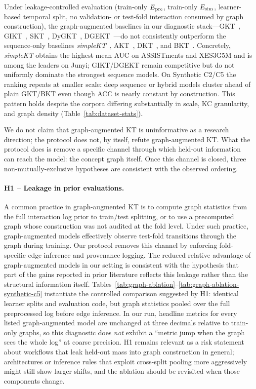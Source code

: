 Under leakage-controlled evaluation (train-only $E_{\text{pre}}$, train-only
$E_{\text{sim}}$, learner-based temporal split, no validation- or test-fold
interaction consumed by graph construction), the graph-augmented
baselines in our diagnostic stack---GKT~\cite{nakagawa2019gkt},
GIKT~\cite{yang2021gikt}, SKT~\cite{tong2020skt},
DyGKT~\cite{dygkt2024}, DGEKT~\cite{dgekt2024}---do not consistently outperform the
sequence-only baselines \textit{simpleKT}~\cite{liu2023simplekt},
AKT~\cite{ghosh2020akt}, DKT~\cite{piech2015dkt}, and BKT~\cite{corbett1995bkt}. Concretely,
\textit{simpleKT} obtains the highest mean AUC on ASSISTments and XES3G5M and is
among the leaders on Junyi; GIKT/DGEKT remain competitive but do not uniformly dominate the strongest sequence models.
On Synthetic C2/C5 the ranking repeats at smaller scale: deep sequence or hybrid models cluster ahead of plain GKT/BKT even though ACC is nearly constant by construction.
This pattern holds despite the corpora differing substantially in scale,
KC granularity, and graph density (Table~\ref{tab:dataset-stats}).

We do not claim that graph-augmented KT is uninformative as a research
direction; the protocol does not, by itself, refute graph-augmented KT.
What the protocol does is remove a specific channel through which
held-out information can reach the model: the concept graph itself.
Once this channel is closed, three non-mutually-exclusive hypotheses
are consistent with the observed ordering.

\paragraph{H1 -- Leakage in prior evaluations.}
A common practice in graph-augmented KT is to compute graph statistics
from the full interaction log prior to train/test splitting, or to use
a precomputed graph whose construction was not audited at the fold
level. Under such practice, graph-augmented models effectively observe
test-fold transitions through the graph during training. Our protocol
removes this channel by enforcing fold-specific edge inference and
provenance logging. The reduced relative advantage of graph-augmented
models in our setting is consistent with the hypothesis that part of
the gains reported in prior literature reflects this leakage rather
than the structural information itself.
Tables~\ref{tab:graph-ablation}--\ref{tab:graph-ablation-synthetic-c5} instantiate the controlled comparison suggested by H1:
identical learner splits and evaluation code, but graph statistics pooled over the full
preprocessed log before edge inference.
In our run, headline metrics for every listed graph-augmented model are unchanged at three decimals relative to
train-only graphs, so this diagnostic does \emph{not} exhibit a ``metric jump when the
graph sees the whole log'' at coarse precision.
H1 remains relevant as a risk statement about workflows that leak held-out mass into
graph construction in general; architectures or inference rules that exploit
cross-split pooling more aggressively might still show larger shifts, and the ablation
should be revisited when those components change.

